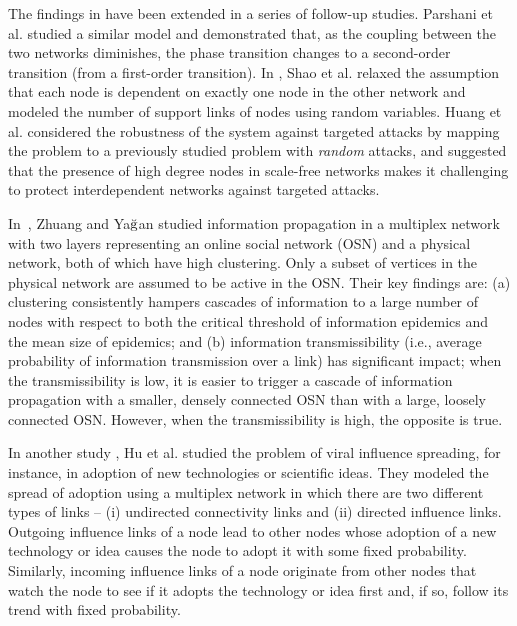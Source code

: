 \documentclass[10pt, journal, compsoc]{IEEEtran}
\begin{document}
The findings in \cite{Buldyrev2010} have been 
extended in a series of follow-up studies. 
Parshani et al. \cite{Parshani2010}
studied a similar model and demonstrated that, as
the coupling between the two networks diminishes, 
the phase transition changes to a second-order
transition (from a first-order transition). 
In \cite{Shao2011}, Shao et al. 
relaxed the assumption that each node is 
dependent on exactly one node in the other
network and modeled the number of support links
of nodes using random variables. Huang et al.
\cite{Huang2011} considered the robustness of
the system against targeted attacks by mapping
the problem to a previously studied problem with
{\em random} attacks, and suggested
that the presence of high degree nodes in scale-free
networks makes it challenging to protect 
interdependent networks against targeted attacks. 


In~\cite{Zhuang2016}, 
Zhuang and Ya$\breve{\rm g}$an
studied information propagation in a multiplex
network with two layers representing 
an online social network (OSN) 
and a physical network, both
of which have high clustering. Only a subset of
vertices in the physical network are assumed to 
be active in the OSN.
Their key findings are: (a) clustering consistently 
hampers cascades of information to a large number of
nodes with respect to both the critical threshold
of information epidemics and the mean size of
epidemics; and (b) information transmissibility 
(i.e., average probability of information 
transmission over a link) has significant impact;
when the transmissibility is low, 
it is easier to trigger a cascade of information 
propagation with a smaller, densely connected 
OSN than with a large, loosely connected OSN. 
However, when the transmissibility is high, the 
opposite is true. 

In another study \cite{Hu2014}, Hu et al. studied
the problem of viral influence
spreading, for instance, in adoption of 
new technologies or scientific ideas. They 
modeled the spread of adoption using a 
multiplex network in which there are two
different types of links -- (i) undirected 
connectivity links and 
(ii) directed influence links. Outgoing
influence links of a node lead to other nodes whose
adoption of a new technology or idea causes
the node to adopt it with some fixed 
probability. Similarly, incoming influence
links of a node originate from other nodes that 
watch the node to see if it adopts the technology
or idea first and, if so, follow its trend 
with fixed probability. 
\end{document}
